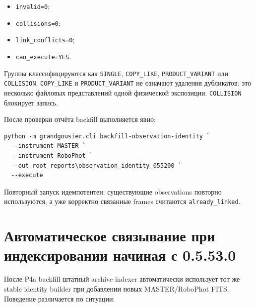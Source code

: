 \begin{itemize}
  \item \texttt{invalid=0};
  \item \texttt{collisions=0};
  \item \texttt{link\_conflicts=0};
  \item \texttt{can\_execute=YES}.
\end{itemize}

Группы классифицируются как \texttt{SINGLE}, \texttt{COPY\_LIKE}, \texttt{PRODUCT\_VARIANT} или \texttt{COLLISION}. \texttt{COPY\_LIKE} и \texttt{PRODUCT\_VARIANT} не означают удаления дубликатов: это несколько файловых представлений одной физической экспозиции. \texttt{COLLISION} блокирует запись.

После проверки отчёта backfill выполняется явно:

\begin{lstlisting}
python -m grandgousier.cli backfill-observation-identity `
  --instrument MASTER `
  --instrument RoboPhot `
  --out-root reports\observation_identity_055200 `
  --execute
\end{lstlisting}

Повторный запуск идемпотентен: существующие observations повторно используются, а уже корректно связанные frames считаются \texttt{already\_linked}.

\section{Автоматическое связывание при индексировании начиная с 0.5.53.0}

После P4a backfill штатный archive indexer автоматически использует тот же stable identity builder при добавлении новых MASTER/RoboPhot FITS. Поведение различается по ситуации:

